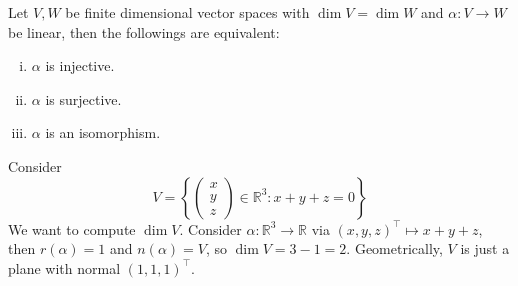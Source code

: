 \documentclass[a4paper]{article}
\begin{document}
\begin{corollary}
    Let $V,W$ be finite dimensional vector spaces with $\dim V=\dim W$ and $\alpha:V\to W$ be linear, then the followings are equivalent:
    \begin{enumerate}[(i)]
        \item $\alpha$ is injective.
        \item $\alpha$ is surjective.
        \item $\alpha$ is an isomorphism.
    \end{enumerate}
\end{corollary}
\begin{example}
    Consider
    $$V=\left\{ \begin{pmatrix}
        x\\
        y\\
        z
    \end{pmatrix}\in\mathbb R^3:x+y+z=0\right\}$$
    We want to compute $\dim V$.
    Consider $\alpha:\mathbb R^3\to\mathbb R$ via $(x,y,z)^\top\mapsto x+y+z$, then $r(\alpha)=1$ and $n(\alpha)=V$, so $\dim V=3-1=2$.
    Geometrically, $V$ is just a plane with normal $(1,1,1)^\top$.
\end{example}
\end{document}
